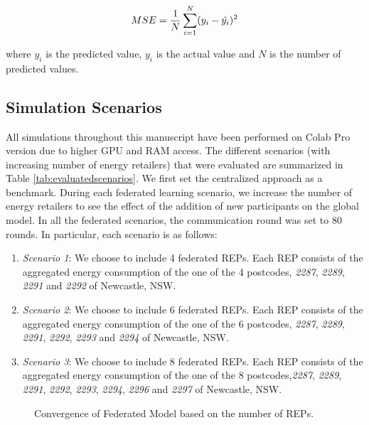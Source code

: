 \documentclass[10pt, conference]{IEEEtran}
\begin{document}
\begin{equation}
    MSE = \dfrac{1}{N}\sum_{i=1}^N (y_{i} - \hat{y_i})\textsuperscript{2}
\end{equation}

\noindent
where $\hat{y_i}$ is the predicted value, $y_i$ is the actual value and $N$ is the number of predicted values.

\subsection{Simulation Scenarios}

All simulations throughout this manuscript have been performed on Colab Pro version due to higher GPU and RAM access. The different scenarios (with increasing number of energy retailers) that were evaluated are summarized in Table \ref{tab:evaluatedscenarios}. We first set the centralized approach as a benchmark. During each federated learning scenario, we increase the number of energy retailers to see the effect of the addition of new participants on the global model. In all the federated scenarios, the communication round was set to 80 rounds.  In particular, each scenario is as follows:

\begin{enumerate}
    \item \textit{Scenario 1}: We choose to include 4 federated REPs. Each REP consists of the aggregated energy consumption of the one of the 4 postcodes, \textit{2287}, \textit{2289}, \textit{2291} and \textit{2292} of Newcastle, NSW.

    \item \textit{Scenario 2}: We choose to include 6 federated REPs. Each REP consists of the aggregated energy consumption of the one of the 6 postcodes, \textit{2287}, \textit{2289}, \textit{2291}, \textit{2292}, \textit{2293} and \textit{2294} of Newcastle, NSW.

    \item \textit{Scenario 3}: We choose to include 8 federated REPs. Each REP consists of the aggregated energy consumption of the one of the 8 postcodes,\textit{2287}, \textit{2289}, \textit{2291}, \textit{2292}, \textit{2293},  \textit{2294}, \textit{2296} and \textit{2297}  of Newcastle, NSW.
\end{enumerate}


\begin{figure*}
    \centering
    \qquad
    \qquad
    \caption{Convergence of Federated Model based on the number of REPs.}%
    \label{fig:trainloss}
\end{figure*}
\end{document}
